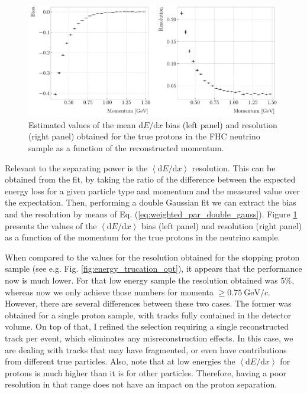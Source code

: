\begin{figure}[t]
	\centering
	\includegraphics[width=.90\linewidth]{Images/GArSoft_PID/dEdx/proton_dEdx_momentum.pdf}
	\caption[Estimated values of the mean $\mathrm{d}E/\mathrm{d}x$ bias and resolution obtained for the true protons in a FHC neutrino sample as a function of the momentum.]{Estimated values of the mean $\mathrm{d}E/\mathrm{d}x$ bias (left panel) and resolution (right panel) obtained for the true protons in the FHC neutrino sample as a function of the reconstructed momentum.}
	\label{fig:proton_dEdx_momentum}
\end{figure}

Relevant to the separating power is the $\left<\mathrm{d}E/\mathrm{d}x\right>$ resolution. This can be obtained from the fit, by taking the ratio of the difference between the expected energy loss for a given particle type and momentum and the measured value over the expectation. Then, performing a double Gaussian fit we can extract the bias and the resolution by means of Eq. (\ref{eq:weighted_par_double_gauss}). Figure \ref{fig:proton_dEdx_momentum} presents the values of the $\left<\mathrm{d}E/\mathrm{d}x\right>$ bias (left panel) and resolution (right panel) as a function of the momentum for the true protons in the neutrino sample.

When compared to the values for the resolution obtained for the stopping proton sample (see e.g. Fig. \ref{fig:energy_trucation_opt}), it appears that the performance now is much lower. For that low energy sample the resolution obtained was $5\%$, whereas now we only achieve those numbers for momenta $\geq 0.75~\mathrm{GeV}/c$. However, there are several differences between these two cases. The former was obtained for a single proton sample, with tracks fully contained in the detector volume. On top of that, I refined the selection requiring a single reconstructed track per event, which eliminates any misreconstruction effects. In this case, we are dealing with tracks that may have fragmented, or even have contributions from different true particles. Also, note that at low energies the $\left<\mathrm{d}E/\mathrm{d}x\right>$ for protons is much higher than it is for other particles. Therefore, having a poor resolution in that range does not have an impact on the proton separation.

